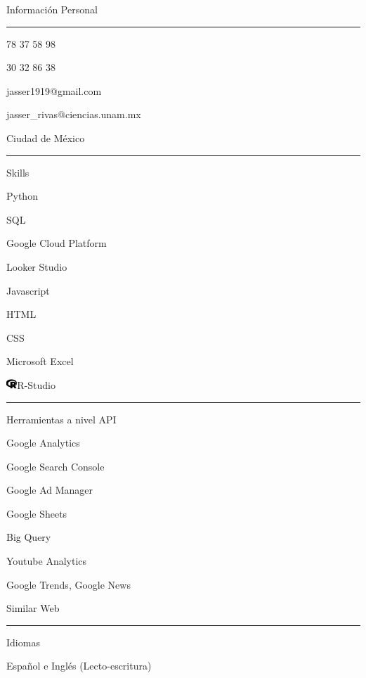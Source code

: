 \documentclass{article}
\begin{document}
\begin{minipage}[t]{0.40\textwidth}
\setlength{\baselineskip}{1.5\baselineskip}
\color{white}
\vspace{.5cm}
{\large Información Personal}

\rule{\linewidth}{0.4pt}

\faPhone{} 78 37 58 98

\faWhatsapp{} 30 32 86 38


\faEnvelope\quad jasser1919@gmail.com

\faEnvelope\quad jasser\_rivas@ciencias.unam.mx

\faMapMarker\quad Ciudad de México

%



\rule{\linewidth}{0.4pt}

{\large Skills}

\faPython\quad Python



\faDatabase\quad SQL

\faCloud\quad Google Cloud Platform

\faChartLine\quad Looker Studio


\faJs\quad Javascript


 \quad HTML

\quad CSS


\faWindows\quad Microsoft Excel

\includegraphics[width=0.16in, decodearray={1 0 1 0 1 0}]{r-project.png}\quad R-Studio




\rule{\linewidth}{0.4pt}

{\large Herramientas a nivel API}


\faChartLine\quad Google Analytics

\faSearchengin\quad Google Search Console

\faFilter\quad Google Ad Manager

\faTable\quad Google Sheets

\faDatabase\quad Big Query

\faYoutube\quad Youtube Analytics

\faNewspaper\quad Google Trends, Google News

\faGlobe\quad Similar Web






\rule{\linewidth}{0.4pt}

{\large Idiomas}

\faLanguage \quad Español e Inglés (Lecto-escritura)

\end{minipage}
\end{document}
